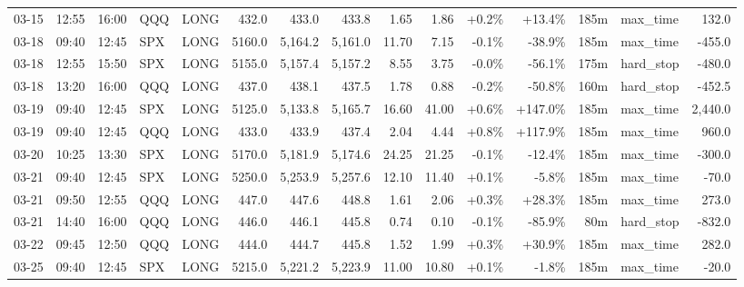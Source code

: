 \documentclass[11pt,a4paper,twoside]{article}
\begin{document}
\begin{landscape}
\begin{center}
\begin{longtable}{>{\color{txtmain}}l l l l l r r r r r r r r >{\color{txtmain}}l r}
03-15 & 12:55 & 16:00 & QQQ & LONG & 432.0 & 433.0 & 433.8 & 1.65 & 1.86 & \textcolor{wingreen}{+0.2\%} & \textcolor{wingreen}{+13.4\%} & 185m & max\_time & \textcolor{wingreen}{132.0} \\
03-18 & 09:40 & 12:45 & SPX & LONG & 5160.0 & 5,164.2 & 5,161.0 & 11.70 & 7.15 & \textcolor{lossred}{-0.1\%} & \textcolor{lossred}{-38.9\%} & 185m & max\_time & \textcolor{lossred}{-455.0} \\
03-18 & 12:55 & 15:50 & SPX & LONG & 5155.0 & 5,157.4 & 5,157.2 & 8.55 & 3.75 & \textcolor{lossred}{-0.0\%} & \textcolor{lossred}{-56.1\%} & 175m & hard\_stop & \textcolor{lossred}{-480.0} \\
03-18 & 13:20 & 16:00 & QQQ & LONG & 437.0 & 438.1 & 437.5 & 1.78 & 0.88 & \textcolor{lossred}{-0.2\%} & \textcolor{lossred}{-50.8\%} & 160m & hard\_stop & \textcolor{lossred}{-452.5} \\
03-19 & 09:40 & 12:45 & SPX & LONG & 5125.0 & 5,133.8 & 5,165.7 & 16.60 & 41.00 & \textcolor{wingreen}{+0.6\%} & \textcolor{wingreen}{+147.0\%} & 185m & max\_time & \textcolor{wingreen}{2,440.0} \\
03-19 & 09:40 & 12:45 & QQQ & LONG & 433.0 & 433.9 & 437.4 & 2.04 & 4.44 & \textcolor{wingreen}{+0.8\%} & \textcolor{wingreen}{+117.9\%} & 185m & max\_time & \textcolor{wingreen}{960.0} \\
03-20 & 10:25 & 13:30 & SPX & LONG & 5170.0 & 5,181.9 & 5,174.6 & 24.25 & 21.25 & \textcolor{lossred}{-0.1\%} & \textcolor{lossred}{-12.4\%} & 185m & max\_time & \textcolor{lossred}{-300.0} \\
03-21 & 09:40 & 12:45 & SPX & LONG & 5250.0 & 5,253.9 & 5,257.6 & 12.10 & 11.40 & \textcolor{wingreen}{+0.1\%} & \textcolor{lossred}{-5.8\%} & 185m & max\_time & \textcolor{lossred}{-70.0} \\
03-21 & 09:50 & 12:55 & QQQ & LONG & 447.0 & 447.6 & 448.8 & 1.61 & 2.06 & \textcolor{wingreen}{+0.3\%} & \textcolor{wingreen}{+28.3\%} & 185m & max\_time & \textcolor{wingreen}{273.0} \\
03-21 & 14:40 & 16:00 & QQQ & LONG & 446.0 & 446.1 & 445.8 & 0.74 & 0.10 & \textcolor{lossred}{-0.1\%} & \textcolor{lossred}{-85.9\%} & 80m & hard\_stop & \textcolor{lossred}{-832.0} \\
03-22 & 09:45 & 12:50 & QQQ & LONG & 444.0 & 444.7 & 445.8 & 1.52 & 1.99 & \textcolor{wingreen}{+0.3\%} & \textcolor{wingreen}{+30.9\%} & 185m & max\_time & \textcolor{wingreen}{282.0} \\
03-25 & 09:40 & 12:45 & SPX & LONG & 5215.0 & 5,221.2 & 5,223.9 & 11.00 & 10.80 & \textcolor{wingreen}{+0.1\%} & \textcolor{lossred}{-1.8\%} & 185m & max\_time & \textcolor{lossred}{-20.0} \\

\end{longtable}
\end{center}
\end{landscape}
\end{document}
